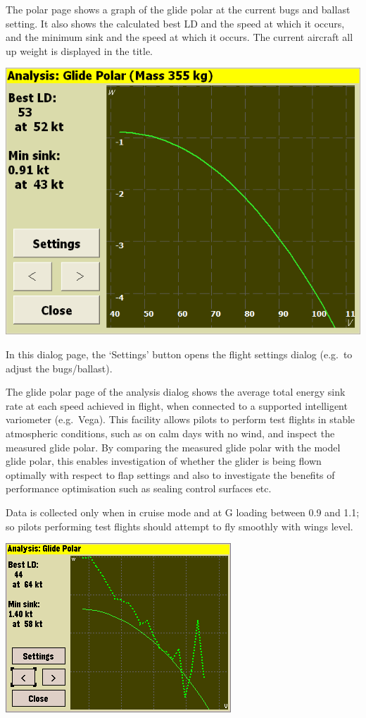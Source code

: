 The polar page shows a graph of the glide polar at the current bugs
and ballast setting.  It also shows the calculated best LD and the
speed at which it occurs, and the minimum sink and the speed at which
it occurs.  The current aircraft all up weight is displayed in the
title.

\begin{center}
\includegraphics[angle=0,width=0.8\linewidth,keepaspectratio='true']{figures/analysis-glidepolar.png}
\end{center}

In this dialog page, the `Settings' button opens the flight settings
dialog (e.g.\ to adjust the bugs/ballast).

The glide polar page of the analysis dialog shows the average total
energy sink rate at each speed achieved in flight, when connected to a
supported intelligent variometer (e.g.\ Vega).  This facility allows
pilots to perform test flights in stable atmospheric conditions, such
as on calm days with no wind, and inspect the measured glide polar.
By comparing the measured glide polar with the model glide polar, this
enables investigation of whether the glider is being flown optimally
with respect to flap settings and also to investigate the benefits of
performance optimisation such as sealing control surfaces etc.

Data is collected only when in cruise mode and at G loading between
0.9 and 1.1; so pilots performing test flights should attempt to fly
smoothly with wings level.

\begin{center}
\includegraphics[angle=0,width=0.8\linewidth,keepaspectratio='true']{figures/shot-glidepolar.png}
\end{center}

